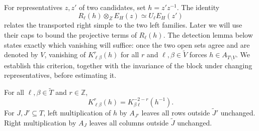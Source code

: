 For representatives $z,z'$ of two candidates, set $h=z'z^{-1}$.
The identity
\[
 R_\ell(h)\otimes_ZE_H(z)\simeq U_\ell E_H(z')
\]
relates the transported right simple to the two left families.  Later
we will use their caps to bound the projective terms of $R_\ell(h)$.
The detection lemma below states exactly which vanishing will suffice:
once the two open sets agree and are denoted by $V$, vanishing of
$K^r_{\ell\beta}(h)$ for all $r$ and
$\ell,\beta\in\widetilde V$ forces $h\in A_{T\setminus V}$.
We establish this criterion, together with the invariance of the block
under changing representatives, before estimating it.
\begin{lemma}
\label{two:duality}
For all $\ell,\beta\in\widetilde T$ and $r\in\mathbb Z$,
\begin{equation}
 K^r_{\ell\beta}(h)=K^{-2-r}_{\beta\ell}(h^{-1}).
 \label{two:duality-equation}
\end{equation}
For $J,J'\subseteq T$, left multiplication of $h$ by $A_{J'}$ leaves all rows outside
$\widetilde J'$ unchanged.  Right multiplication by $A_J$ leaves
all columns outside $\widetilde J$ unchanged.
\end{lemma}
